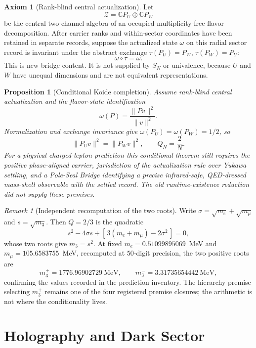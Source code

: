 \documentclass[11pt]{article}
\theoremstyle{plain}
\newtheorem{proposition}[theorem]{Proposition}
\theoremstyle{definition}
\newtheorem{axiom}[theorem]{Axiom}
\theoremstyle{remark}
\newtheorem{remark}[theorem]{Remark}
\begin{document}
\begin{axiom}[Rank-blind central actualization]
Let
\[
\mathcal Z=\mathbb C P_U\oplus\mathbb C P_W
\]
be the central two-channel algebra of an occupied multiplicity-free flavor decomposition. After carrier ranks and within-sector coordinates have been retained in separate records, suppose the actualized state \(\omega\) on this radial sector record is invariant under the abstract exchange \(\tau(P_U)=P_W\), \(\tau(P_W)=P_U\):
\[
\omega\circ\tau=\omega.
\]
This is new bridge content. It is not supplied by \(S_N\) or univalence, because \(U\) and \(W\) have unequal dimensions and are not equivalent representations.
\end{axiom}

\begin{proposition}[Conditional Koide completion]
Assume rank-blind central actualization and the flavor-state identification
\[
\omega(P)=\frac{\|Pv\|^2}{\|v\|^2}.
\]
Normalization and exchange invariance give \(\omega(P_U)=\omega(P_W)=1/2\), so
\[
\|P_Uv\|^2=\|P_Wv\|^2,
\qquad
\boxed{Q_N=\frac2N}.
\]
For a physical charged-lepton prediction this conditional theorem still requires the positive phase-aligned carrier, jurisdiction of the actualization rule over Yukawa settling, and a \emph{Pole-Seal Bridge} identifying a precise infrared-safe, QED-dressed mass-shell observable with the settled record. The old runtime-existence reduction did not supply these premises.
\end{proposition}

\begin{remark}[Independent recomputation of the two roots]
Write \(\sigma=\sqrt{m_e}+\sqrt{m_\mu}\) and \(s=\sqrt{m_3}\). Then \(Q=2/3\) is the quadratic
\[
s^2-4\sigma s+\left[\,3(m_e+m_\mu)-2\sigma^2\,\right]=0 ,
\]
whose two roots give \(m_3=s^2\). At fixed \(m_e=0.51099895069\)~MeV and \(m_\mu=105.6583755\)~MeV, recomputed at \(50\)-digit precision, the two positive roots are
\[
m_3^{+}=1776.96902729~\text{MeV},
\qquad
m_3^{-}=3.31735654442~\text{MeV},
\]
confirming the values recorded in the prediction inventory. The hierarchy premise selecting \(m_3^{+}\) remains one of the four registered premise closures; the arithmetic is not where the conditionality lives.
\end{remark}

\section{Holography and Dark Sector}
\end{document}
